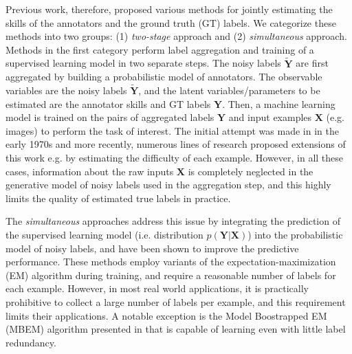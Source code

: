 Previous work, therefore, proposed various methods for jointly estimating the skills of the annotators and the ground truth (GT) labels. We categorize these methods into two groups: (1) \textit{two-stage} approach and (2) \textit{simultaneous} approach. Methods in the first category perform label aggregation and training of a supervised learning model in two separate steps. The noisy labels $\widetilde{\mathbf{Y}}$ are first aggregated by building a probabilistic model of annotators. The observable variables are the noisy labels $\widetilde{\mathbf{Y}}$, and the latent variables/parameters to be estimated are the annotator skills and GT labels $\mathbf{Y}$. Then, a machine learning model is trained on the pairs of aggregated labels $\mathbf{Y}$ and input examples $\mathbf{X}$ (e.g. images) to perform the task of interest. The initial attempt was made in \cite{dawid1979maximum} in the early 1970s and more recently, numerous lines of research \cite{smyth1995inferring,warfield2004simultaneous,whitehill2009whose,welinder2010multidimensional,rodrigues2013learning} proposed extensions of this work e.g. by estimating the difficulty of each example. However, in all these cases, information about the raw inputs $\mathbf{X}$ is completely neglected in the generative model of noisy labels used in the aggregation step, and this highly limits the quality of estimated true labels in practice.

The \textit{simultaneous} approaches \cite{raykar2009supervised,yan2010modeling,branson2017lean,van2018lean} address this issue by integrating the prediction of the supervised learning model (i.e. distribution $p(\mathbf{Y}|\mathbf{X})$) into the probabilistic model of noisy labels, and have been shown to improve the predictive performance. These methods employ variants of the expectation-maximization (EM) algorithm during training, and require a reasonable number of labels for each example. However, in most real world applications, it is practically prohibitive to collect a large number of labels per example, and this requirement limits their applications. A notable exception is the Model Boostrapped EM (MBEM) algorithm presented in \cite{khetan2017learning} that is capable of learning even with little label redundancy. 




